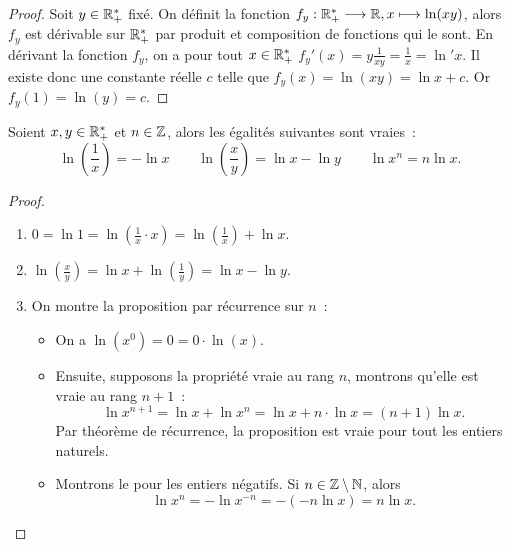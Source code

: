 \begin{proof}
    Soit \(y \in \mathbb{R}_{+}^{*}\) fixé. On définit la fonction 
    \(f_y:\mathbb{R}_{+}^{*} \longrightarrow \mathbb{R}, x \longmapsto \ln(xy)\), alors \(f_y\) est 
    dérivable sur \(\mathbb{R}_{+}^{*}\) par produit et composition de fonctions 
    qui le sont. En dérivant la fonction \(f_y\), on a pour tout \(x \in 
    \mathbb{R}_{+}^{*}\) \(f_y'(x) = y \frac{1}{xy} = \frac{1}{x} = \ln' x\).
    Il existe donc une constante réelle \(c\) telle que \(f_y(x) = \ln(xy) = \ln 
    x + c\). Or \(f_y(1) = \ln(y) = c\).
\end{proof}

\begin{corth}
    Soient \(x, y \in \mathbb{R}_{+}^{*}\) et \(n \in \mathbb{Z}\), alors les égalités 
    suivantes sont vraies~:
    \begin{equation}
        \ln \left(\frac{1}{x}\right) = -\ln x \qquad \ln 
        \left(\frac{x}{y}\right) = \ln x - \ln y \qquad \ln x^n = n\ln x.
    \end{equation}
\end{corth}

\begin{proof}
    \begin{enumerate}
        \item \( 0 = \ln 1 = \ln \left(\frac{1}{x} \cdot x \right) = \ln 
            \left(\frac{1}{x}\right) + \ln x \).
        \item \( \ln \left(\frac{x}{y}\right) = \ln x + \ln 
            \left(\frac{1}{y}\right) = \ln x - \ln y\).
        \item On montre la proposition par récurrence sur \(n\)~:
            \begin{itemize}
                \item On a \(\ln(x^0) = 0 = 0 \cdot \ln(x)\).
                \item Ensuite, supposons la propriété vraie au rang \(n\), 
                    montrons qu'elle est vraie au rang \(n+1\)~:
                    \[\ln x^{n+1} = \ln x + \ln x^n = \ln x + n \cdot \ln 
                    x = (n+1) \ln x.\]                    
                    Par théorème de récurrence, la proposition est vraie 
                    pour tout les entiers naturels.
                \item Montrons le pour les entiers négatifs. Si \(n \in 
                    \mathbb{Z}\setminus\mathbb{N}\), alors 
                    \[\ln x^n = -\ln x^{-n} = -(-n\ln x) = n\ln x.\]
            \end{itemize}
    \end{enumerate}
\end{proof}

